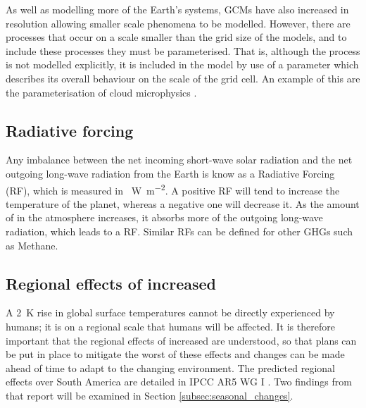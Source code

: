 \documentclass{article}
\begin{document}
As well as modelling more of the Earth's systems, GCMs have also increased in resolution allowing smaller scale phenomena to be modelled. However, there are processes that occur on a scale smaller than the grid size of the models, and to include these processes they must be parameterised. That is, although the process is not modelled explicitly, it is included in the model by use of a parameter which describes its overall behaviour on the scale of the grid cell. An example of this are the parameterisation of cloud microphysics \parencite{walko1995new, neelin2011climate}.

\subsection{Radiative forcing}
Any imbalance between the net incoming short-wave solar radiation and the net outgoing long-wave radiation from the Earth is know as a Radiative Forcing (RF), which is measured in \SI{}{W.m^{-2}}. A positive RF will tend to increase the temperature of the planet, whereas a negative one will decrease it. As the amount of  in the atmosphere increases, it absorbs more of the outgoing long-wave radiation, which leads to a RF. Similar RFs can be defined for other GHGs such as Methane.


\subsection{Regional effects of increased }
\label{sec:regional_effects}
A \SI{2}{K} rise in global surface temperatures cannot be directly experienced by humans; it is on a regional scale that humans will be affected. It is therefore important that the regional effects of increased  are understood, so that plans can be put in place to mitigate the worst of these effects and changes can be made ahead of time to adapt to the changing environment. The predicted regional effects over South America are detailed in IPCC AR5 WG I \parencite{ipcc2014wg1}. Two findings from that report will be examined in Section \ref{subsec:seasonal_changes}.
\end{document}
